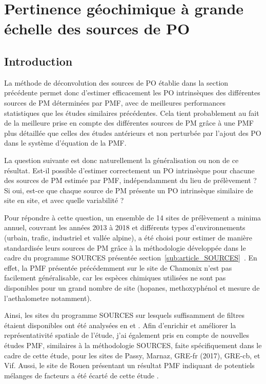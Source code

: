 \section{Pertinence géochimique à grande échelle des sources de PO}%
\label{sec:synthèse_grande_échelle}

\subsection{Introduction}%
\label{sub:introduction_synthèse_nationale}

La méthode de déconvolution des sources de PO établie dans la section précédente permet donc
d'estimer efficacement les PO intrinsèques des différentes sources de PM déterminées par
PMF, avec de meilleures performances statistiques que les études similaires précédentes.
Cela tient probablement au fait de la meilleure prise en compte des différentes sources de
PM grâce à une PMF plus détaillée que celles des études antérieurs et non
perturbée par l'ajout des PO dans le système d'équation de la PMF.

La question suivante est donc naturellement la généralisation ou non de ce résultat.
Est-il possible d'estimer correctement un PO intrinsèque pour chacune des sources de PM
estimée par PMF, indépendamment du lieu de prélèvement ? Si oui, est-ce que chaque source
de PM présente un PO intrinsèque similaire de site en site, et avec quelle variabilité ?

Pour répondre à cette question, un ensemble de 14 sites de prélèvement a minima annuel, couvrant les
années 2013 à 2018 et différents types d'environnements (urbain, trafic, industriel et vallée alpine),
a été choisi pour estimer de manière standardisée leurs sources de PM grâce à la
méthodologie développée dans le cadre du programme SOURCES présentée
section~\ref{sub:article_SOURCES}~\autocite{weberSources2019}. En effet, la PMF présentée précédemment sur le site de
Chamonix n'est pas facilement généralisable, car les espèces chimiques utilisées ne sont
pas disponibles pour un grand nombre de site (hopanes, methoxyphénol et mesure de
l'aethalometre notamment).

Ainsi, les sites du programme SOURCES sur lesquels suffisamment de filtres étaient
disponibles ont été analysées en \POAA{} et \PODTT. Afin d'enrichir et améliorer la
représentativité spatiale de l'étude, j'ai également pris en compte de nouvelles études
PMF, similaires à la méthodologie SOURCES, faite spécifiquement dans le cadre de cette
étude, pour les sites de Passy, Marnaz, GRE-fr (2017), GRE-cb, et Vif.
Aussi, le site de Rouen présentant un résultat PMF indiquant de potentiels mélanges de
facteurs a été écarté de cette étude \autocite{weberComparison2019}.

